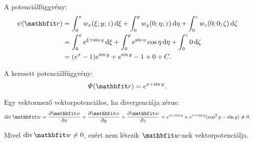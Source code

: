 \documentclass[exercise]{math-standalone}
\begin{document}
\begin{exercise}
{\begin{enumerate}[a)]
\begin{itemize}
                    A potenciálfüggvény:
                    \begin{align*}
                      \psi(\rvec r)
                       & =
                      \int_0^x w_x(\xi; y; z) \,\diff \xi +
                      \int_0^y w_y(0; \eta; z) \,\diff \eta +
                      \int_0^z w_z(0; 0; \zeta) \,\diff \zeta
                      \\
                       & =
                      \int_0^x e^{\xi + \sin y} \,\diff \xi +
                      \int_0^y e^{\sin \eta} \cos \eta \,\diff \eta +
                      \int_0^z 0 \,\diff \zeta
                      \\
                       & =
                      (e^x - 1) e^{\sin y} + e^{\sin y} - 1 + 0 + C
                      \text.
                    \end{align*}

                    A keresett potenciálfüggvény:
                    \[
                      \varPsi(\rvec r)
                      =
                      e^{x + \sin y}
                      \text.
                    \]

                    Egy vektormező vektorpotenciálos, ha divergenciája zérus:
                    \[
                      \Div \rvec w
                      =
                      \pdv{\rvec w}{x} + \pdv{\rvec w}{y} + \pdv{\rvec w}{z}
                      =
                      e^{x + \sin y} + e^{x + \sin y}(\cos^2 y - \sin y)
                      \neq 0
                      \text.
                    \]

                    Mivel $\Div \rvec w \neq 0$, ezért nem létezik $\rvec w$-nek
                    vektorpotenciálja.
            \end{itemize}


\end{enumerate}}
\end{exercise}
\end{document}

